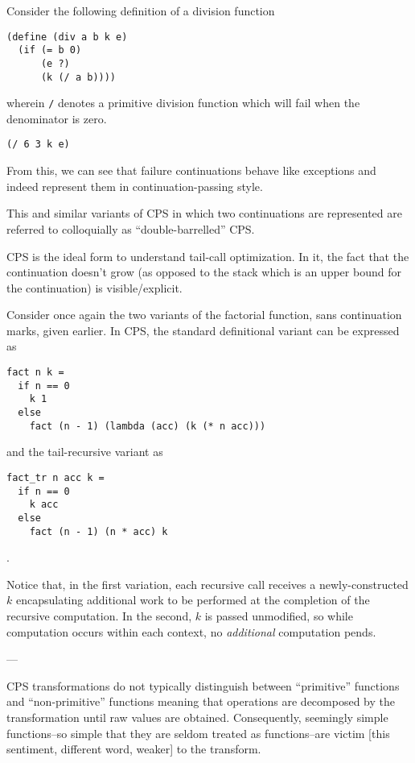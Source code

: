 \documentclass[ms]{byuprop}
\newcounter{definition}
\newcounter{example}
\begin{document}
Consider the following definition of a division function
\begin{verbatim}
(define (div a b k e)
  (if (= b 0)
      (e ?)
      (k (/ a b))))
\end{verbatim}
wherein \texttt{/} denotes a primitive division function which will fail when the 
denominator is zero.


\begin{verbatim}
(/ 6 3 k e)
\end{verbatim}

From this, we can see that failure continuations behave like exceptions and indeed 
represent them in continuation-passing style.

This and similar variants of CPS in which two continuations are represented are 
referred to colloquially as ``double-barrelled'' CPS.

CPS is the ideal form to understand tail-call optimization. In it, the fact that the 
continuation doesn't grow (as opposed to the stack which is an upper bound for the 
continuation) is visible/explicit. 

Consider once again the two variants of the factorial function, sans continuation marks, 
given earlier. In CPS, the standard definitional variant can be expressed as

\begin{verbatim}
fact n k = 
  if n == 0
    k 1
  else
    fact (n - 1) (lambda (acc) (k (* n acc)))
\end{verbatim}

and the tail-recursive variant as

\begin{verbatim}
fact_tr n acc k =
  if n == 0
    k acc
  else
    fact (n - 1) (n * acc) k
\end{verbatim}.

Notice that, in the first variation, each recursive call receives a newly-constructed 
$k$ encapsulating additional work to be performed at the completion of the recursive 
computation. In the second, $k$ is passed unmodified, so while computation occurs 
within each context, no \emph{additional} computation pends.

---

CPS transformations do not typically distinguish between ``primitive'' functions and ``non-primitive'' functions meaning that operations are decomposed by the transformation until raw values are obtained. Consequently, seemingly simple functions--so simple that they are seldom treated as functions--are victim [this sentiment, different word, weaker] to the transform.
\end{document}
